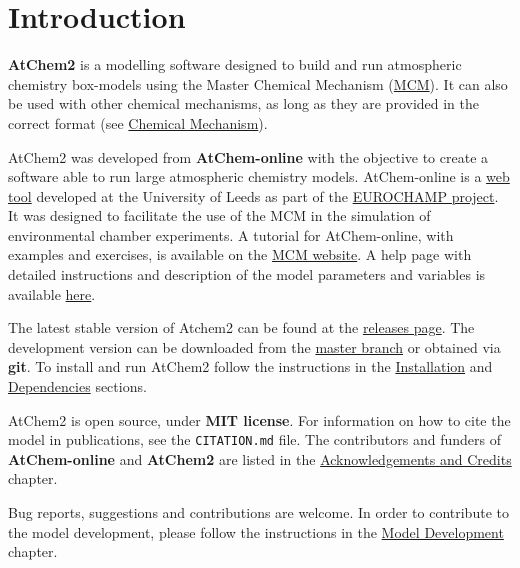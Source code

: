 %
%
%
%
\chapter{Introduction} \label{ch:introduction}

\textbf{AtChem2} is a modelling software designed to build and run
atmospheric chemistry box-models using the Master Chemical Mechanism
(\href{http://mcm.leeds.ac.uk/MCM/}{MCM}). It can also be used with
other chemical mechanisms, as long as they are provided in the correct
format (see \hyperref[sec:mechanism]{Chemical Mechanism}).

AtChem2 was developed from \textbf{AtChem-online} with the objective
to create a software able to run large atmospheric chemistry
models. AtChem-online is a
\href{https://atchem.leeds.ac.uk/webapp/}{web tool} developed at the
University of Leeds as part of the
\href{https://www.eurochamp.org/}{EUROCHAMP project}. It was designed
to facilitate the use of the MCM in the simulation of environmental
chamber experiments. A tutorial for AtChem-online, with examples and
exercises, is available on the
\href{http://mcm.leeds.ac.uk/MCMv3.3.1/atchem/tutorial_intro.htt}{MCM
  website}. A help page with detailed instructions and description of
the model parameters and variables is available
\href{https://atchem.leeds.ac.uk/webapp/run/help.html}{here}.

The latest stable version of Atchem2 can be found at the
\href{https://github.com/AtChem/AtChem2/releases}{releases page}. The
development version can be downloaded from the
\href{https://github.com/AtChem/AtChem2/archive/master.zip}{master
  branch} or obtained via \textbf{git}. To install and run AtChem2
follow the instructions in the \hyperref[sec:install]{Installation}
and \hyperref[sec:dependencies]{Dependencies} sections.

AtChem2 is open source, under \textbf{MIT license}. For information on
how to cite the model in publications, see the \texttt{CITATION.md}
file. The contributors and funders of \textbf{AtChem-online} and
\textbf{AtChem2} are listed in the
\hyperref[ch:credits]{Acknowledgements and Credits} chapter.

Bug reports, suggestions and contributions are welcome. In order to
contribute to the model development, please follow the instructions in
the \hyperref[ch:development]{Model Development} chapter.
